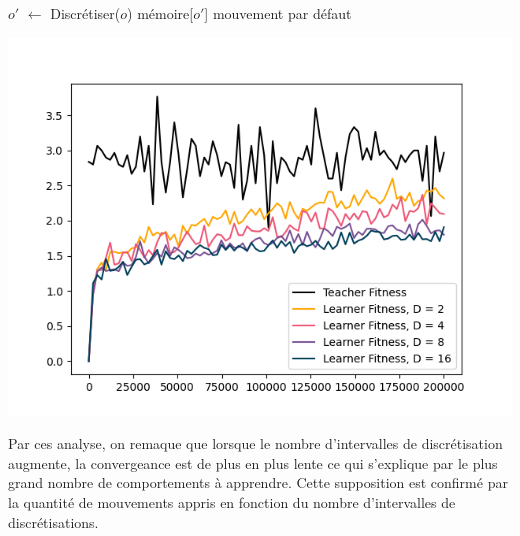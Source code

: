 \documentclass[a4paper, 12pt]{report}
\begin{document}
\begin{algorithm}[H]
	\;
	$o'$ $\leftarrow$ Discrétiser($o$)\;
	{\Return mémoire[$o'$]}
	\Return mouvement par défaut\;
\end{algorithm}
	
	
\includegraphics{averageComparisons}


	Par ces analyse, on remaque que lorsque le nombre d'intervalles de discrétisation augmente, la convergeance est de plus en plus lente ce qui s'explique par le plus grand nombre de comportements à apprendre.
	 Cette supposition est confirmé par la quantité de mouvements appris en fonction du nombre d'intervalles de discrétisations.
	 
\end{document}
